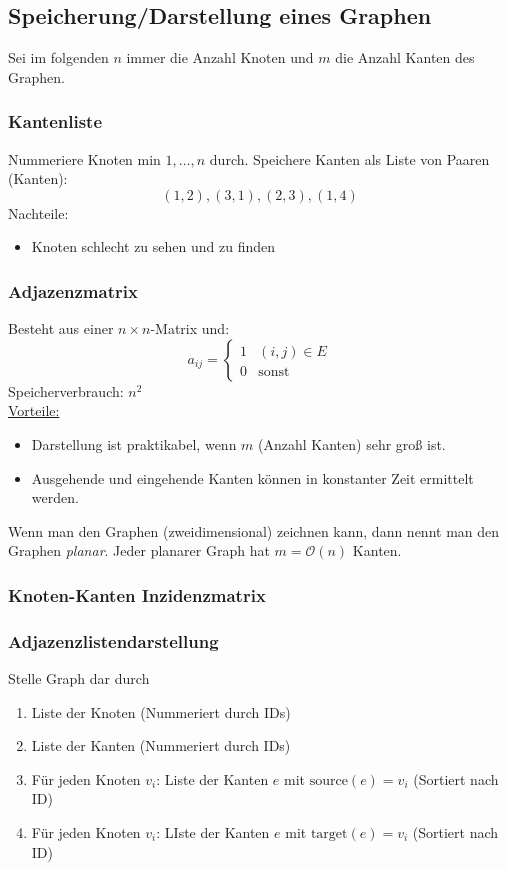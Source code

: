 \documentclass[11pt]{scrartcl}
\begin{document}
\subsection{Speicherung/Darstellung eines Graphen}
Sei im folgenden $n$ immer die Anzahl Knoten und $m$ die Anzahl Kanten des Graphen.

\subsubsection{Kantenliste}
Nummeriere Knoten min $1,\dotsc,n$ durch.
Speichere Kanten als Liste von Paaren (Kanten):
\[
(1,2), (3,1), (2,3), (1,4)
\]
Nachteile:
\begin{itemize}
\item Knoten schlecht zu sehen und zu finden
\end{itemize}
\subsubsection{Adjazenzmatrix}
Besteht aus einer $n\times n$-Matrix und:
\[
a_{ij} = \begin{cases}
1&(i,j)\in E\\
0& \text{sonst}
\end{cases}
\]
Speicherverbrauch: $n^2$\\
\underline{Vorteile:}
\begin{itemize}
\item Darstellung ist praktikabel, wenn $m$ (Anzahl Kanten) sehr groß ist.
\item Ausgehende und eingehende Kanten können in konstanter Zeit ermittelt werden.
\end{itemize}

\begin{note}
Wenn man den Graphen (zweidimensional) zeichnen kann, dann nennt man den Graphen \emph{planar}.
Jeder planarer Graph hat $m=\mathcal O(n)$ Kanten.
\end{note}

\subsubsection{Knoten-Kanten Inzidenzmatrix}

\subsubsection{Adjazenzlistendarstellung}
Stelle Graph dar durch
\begin{enumerate}
\item Liste der Knoten (Nummeriert durch IDs)
\item Liste der Kanten (Nummeriert durch IDs)
\item Für jeden Knoten $v_i$: Liste der Kanten $e$ mit $\text{source}(e)=v_i$ (Sortiert nach ID)
\item Für jeden Knoten $v_i$: LIste der Kanten $e$ mit $\text{target}(e)=v_i$ (Sortiert nach ID)
\end{enumerate}
\end{document}
